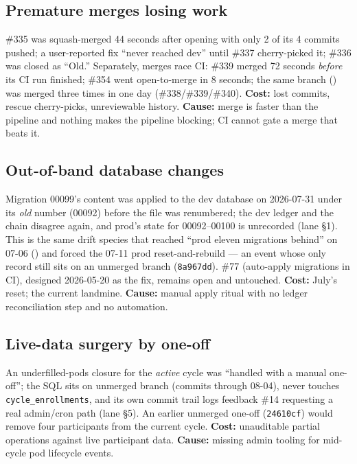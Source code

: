 \documentclass[10pt]{article}
\newcommand{\gh}[1]{\mbox{\##1}}
\begin{document}
\subsection{Premature merges losing work}
\gh{335} was squash-merged 44 seconds after opening with only 2 of its 4 commits pushed; a user-reported fix ``never reached dev'' until \gh{337} cherry-picked it; \gh{336} was closed as ``Old.'' Separately, merges race CI: \gh{339} merged 72 seconds \emph{before} its CI run finished; \gh{354} went open-to-merge in 8 seconds; the same branch () was merged three times in one day (\gh{338}/\gh{339}/\gh{340}). \textbf{Cost:} lost commits, rescue cherry-picks, unreviewable history. \textbf{Cause:} merge is faster than the pipeline and nothing makes the pipeline blocking; CI cannot gate a merge that beats it.

\subsection{Out-of-band database changes}
Migration 00099's content was applied to the dev database on 2026-07-31 under its \emph{old} number (00092) before the file was renumbered; the dev ledger and the chain disagree again, and prod's state for 00092--00100 is unrecorded (lane  \S1). This is the same drift species that reached ``prod eleven migrations behind'' on 07-06 () and forced the 07-11 prod reset-and-rebuild --- an event whose only record still sits on an unmerged branch (\texttt{8a967dd}). \gh{77} (auto-apply migrations in CI), designed 2026-05-20 as the fix, remains open and untouched. \textbf{Cost:} July's reset; the current landmine. \textbf{Cause:} manual apply ritual with no ledger reconciliation step and no automation.

\subsection{Live-data surgery by one-off}
An underfilled-pods closure for the \emph{active} cycle was ``handled with a manual one-off''; the SQL sits on unmerged branch  (commits through 08-04), never touches \texttt{cycle\_enrollments}, and its own commit trail logs feedback \#14 requesting a real admin/cron path (lane  \S5). An earlier unmerged one-off (\texttt{24610cf}) would remove four participants from the current cycle. \textbf{Cost:} unauditable partial operations against live participant data. \textbf{Cause:} missing admin tooling for mid-cycle pod lifecycle events.
\end{document}
